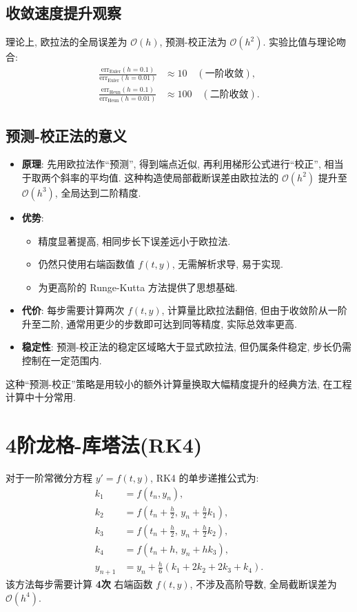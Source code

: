 \documentclass[12pt,a4paper]{ctexart}
\begin{document}
\subsection*{收敛速度提升观察}
理论上, 欧拉法的全局误差为 $\mathcal{O}(h)$, 预测-校正法为 $\mathcal{O}(h^2)$. 实验比值与理论吻合: 
\begin{align*}
    \frac{\text{err}_\text{Euler}(h=0.1)}{\text{err}_\text{Euler}(h=0.01)} &\approx 10 \quad(\text{一阶收敛}), \\
    \frac{\text{err}_\text{Heun}(h=0.1)}{\text{err}_\text{Heun}(h=0.01)} &\approx 100 \quad(\text{二阶收敛}).
\end{align*}

\subsection*{预测-校正法的意义}
\begin{itemize}
    \item \textbf{原理}: 先用欧拉法作“预测”, 得到端点近似, 再利用梯形公式进行“校正”, 相当于取两个斜率的平均值. 这种构造使局部截断误差由欧拉法的 $\mathcal{O}(h^2)$ 提升至 $\mathcal{O}(h^3)$, 全局达到二阶精度. 
    \item \textbf{优势}: 
    \begin{itemize}
        \item 精度显著提高, 相同步长下误差远小于欧拉法. 
        \item 仍然只使用右端函数值 $f(t,y)$, 无需解析求导, 易于实现. 
        \item 为更高阶的 Runge-Kutta 方法提供了思想基础. 
    \end{itemize}
    \item \textbf{代价}: 每步需要计算两次 $f(t,y)$, 计算量比欧拉法翻倍, 但由于收敛阶从一阶升至二阶, 通常用更少的步数即可达到同等精度, 实际总效率更高. 
    \item \textbf{稳定性}: 预测-校正法的稳定区域略大于显式欧拉法, 但仍属条件稳定, 步长仍需控制在一定范围内. 
\end{itemize}

这种“预测-校正”策略是用较小的额外计算量换取大幅精度提升的经典方法, 在工程计算中十分常用. 
\section{4阶龙格-库塔法(RK4)}
对于一阶常微分方程 $y' = f(t,y)$, RK4 的单步递推公式为: 
\begin{equation}
\begin{aligned}
k_1 &= f(t_n, y_n),\\
k_2 &= f\!\left(t_n+\frac{h}{2},\, y_n+\frac{h}{2}k_1\right),\\
k_3 &= f\!\left(t_n+\frac{h}{2},\, y_n+\frac{h}{2}k_2\right),\\
k_4 &= f(t_n+h,\, y_n+hk_3),\\[4pt]
y_{n+1} &= y_n + \frac{h}{6}(k_1+2k_2+2k_3+k_4).
\end{aligned}
\label{eq:rungekutta4}
\end{equation}
该方法每步需要计算 \textbf{4次} 右端函数 $f(t,y)$, 不涉及高阶导数, 全局截断误差为 $\mathcal{O}(h^4)$. 
\end{document}
